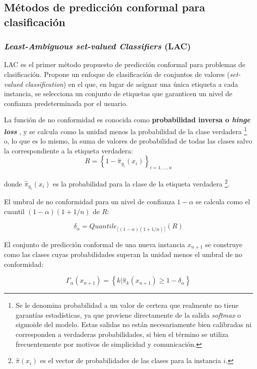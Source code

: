 \subsection{Métodos de predicción conformal para clasificación}

\subsubsection{\textit{Least-Ambiguous set-valued Classifiers} (LAC)}

LAC \cite{sadinle2019} es el primer método propuesto de predicción conformal para problemas de clasificación. 
Propone un enfoque de clasificación de conjuntos de valores (\textit{set-valued classification}) en el que, 
en lugar de asignar una única etiqueta a cada instancia, se selecciona un conjunto de etiquetas que 
garanticen un nivel de confianza predeterminada por el usuario.

La función de no conformidad es conocida como \textbf{probabilidad inversa o \textit{hinge loss}} 
\cite{johansson2017}, y se calcula como la unidad menos la probabilidad de la clase verdadera 
\footnote{
    Se le denomina probabilidad a un valor de certeza que realmente no tiene garantías estadísticas,
    ya que proviene directamente de la salida \textit{softmax} o sigmoide del modelo. Estas salidas no 
    están necesariamente bien calibradas ni corresponden a verdaderas probabilidades, si bien el término 
    se utiliza frecuentemente por motivos de simplicidad y comunicación.
}
o, lo que es lo mismo, la suma de valores de probabilidad de todas las clases salvo
la correspondiente a la etiqueta verdadera:
$$
R = \left\{ 1 - \hat{\pi}_{y_i}(x_i) \right\}_{i=1,...,n}
$$

donde $\hat{\pi}_{y_i}(x_i)$ es la probabilidad para la clase de la etiqueta verdadera
\footnote{
    $\hat{\pi}(x_i)$ es el vector de probabilidades de las clases para la instancia $i$.
}.


El umbral de no conformidad para un nivel de confianza $1-\alpha$ se calcula como el cuantil 
$(1-\alpha)(1+1/n)$ de $R$:

$$
\delta_\alpha = Quantile_{ \lceil  (1-\alpha) (1 + 1/n)  \rceil } ( R )
$$

El conjunto de predicción conformal de una nueva instancia $x_{n+1}$ se construye como las clases cuyas 
probabilidades superan la unidad menos el umbral de no conformidad:

$$
\Gamma_\alpha(x_{n+1}) = \left\{ k | \hat{\pi}_k(x_{n+1}) \ge 1-\delta_\alpha \right\} 
$$

